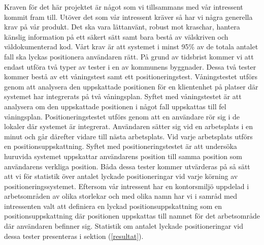 \documentclass[swedish, a4paper,12pt]{article}
\begin{document}
%
%
%
%
%
Kraven för det här projektet är något som vi tillsammans med vår intressent kommit fram till. Utöver det som vår intressent kräver så har vi några generella krav på vår produkt. Det ska vara lättanvänt, robust mot kraschar, hantera känslig information på ett säkert sätt samt bara bestå av välskriven och väldokumenterad kod. Vårt krav är att systemet i minst 95\% av de totala antalet fall ska lyckas positionera användaren rätt. På grund av tidsbrist kommer vi att endast utföra två typer av tester i en av kommunens byggnader. Dessa två tester kommer bestå av ett våningstest samt ett positioneringstest. Våningstestet utförs genom att analysera den uppskattade positionen för en klientenhet på platser där systemet har integrerats på två våningsplan. Syftet med våningstestet är att analysera om den uppskattade positionen i något fall uppskattas till fel våningsplan. Positioneringstestet utförs genom att en användare rör sig i de lokaler där systemet är integrerat. Användaren sätter sig vid en arbetsplats i en minut och går därefter vidare till nästa arbetsplats. Vid varje arbetsplats utförs en positionsuppskattning. Syftet med positioneringstestet är att undersöka huruvida systemet uppskattar användarens position till samma position som användarens verkliga position.
Båda dessa tester kommer utvärderas på så sätt att vi för statistik över antalet lyckade positioneringar vid varje körning av positioneringssystemet. Eftersom vår intressent har en kontorsmiljö uppdelad i arbetsområden av olika storlekar och med olika namn har vi i samråd med intressenten valt att definiera en lyckad positionsuppskattning som en positionsuppskattning där  positionen uppskattas till namnet för det arbetsområde där användaren befinner sig.
Statistik om antalet lyckade positioneringar vid dessa tester presenteras i sektion (\ref{resultat}).
\end{document}
